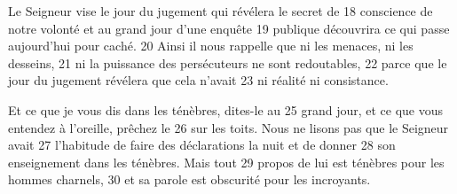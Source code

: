 Le Seigneur vise le jour du jugement qui révélera le secret de	 
18	 	conscience de notre volonté et au grand jour d'une enquête	 
19	 	publique découvrira ce qui passe aujourd'hui pour caché.	 
20	 	Ainsi il nous rappelle que ni les menaces, ni les desseins,	 
21	 	ni la puissance des persécuteurs ne sont redoutables,	 
22	 	parce que le jour du jugement révélera que cela n'avait	 
23	 	ni réalité ni consistance.

Et ce que je vous dis dans les ténèbres, dites-le au	 
25	 	grand jour, et ce que vous entendez à l'oreille, prêchez le	 
26	 	sur les toits. Nous ne lisons pas que le Seigneur avait	 
27	 	l'habitude de faire des déclarations la nuit et de donner	 
28	 	son enseignement dans les ténèbres. Mais tout	 
29	 	propos de lui est ténèbres pour les hommes charnels,	 
30	 	et sa parole est obscurité pour les incroyants.

